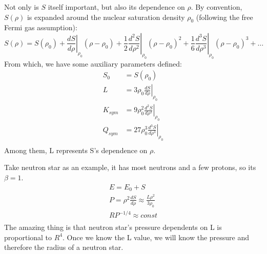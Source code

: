 Not only is $S$ itself important, but also its dependence on $\rho$. 
By convention, $S(\rho)$ is expanded around the nuclear saturation density $\rho_0$
(following the free Fermi gas assumption):
\begin{equation}
    S(\rho) = S(\rho_0) 
    + \left.\frac{dS}{d\rho}\right|_{\rho_0}(\rho - \rho_0)
    + \frac{1}{2}\left.\frac{d^2S}{d\rho^2}\right|_{\rho_0}(\rho - \rho_0)^2
    + \frac{1}{6}\left.\frac{d^3S}{d\rho^3}\right|_{\rho_0}(\rho - \rho_0)^3
    + \dots
\end{equation}
From which, we have some auxiliary parameters defined:
\begin{equation}
    \begin{aligned}
	S_0 &= S(\rho_0)	\\
	L   &= 3\rho_0\left.\frac{dS}{d\rho}\right|_{\rho_0}	\\
	K_{sym}	&= 9\rho_0^2\left.\frac{d^2S}{d\rho^2}\right|_{\rho_0}	\\
	Q_{sym}	&= 27\rho_0^3\left.\frac{d^3S}{d\rho^3}\right|_{\rho_0}	\\
    \end{aligned}
\end{equation}
Among them, L represents S's dependence on $\rho$.

Take neutron star \cite{Lattimer.2001} as an example, it has most neutrons and 
a few protons, so its $\beta = 1$.
\begin{equation}
    \label{eq:neutron-star}
    \begin{aligned}
	 E = E_0 + S	\\
	 P = \rho^2 \frac{dS}{d\rho} \approx \frac{L\rho^2}{3\rho_0}	\\
	 RP^{-1/4} \approx const    \\
    \end{aligned}
\end{equation}
The amazing thing is that neutron star's pressure dependents on L is proportional
to $R^4$. Once we know the L value, we will know the pressure and therefore the 
radius of a neutron star. %

